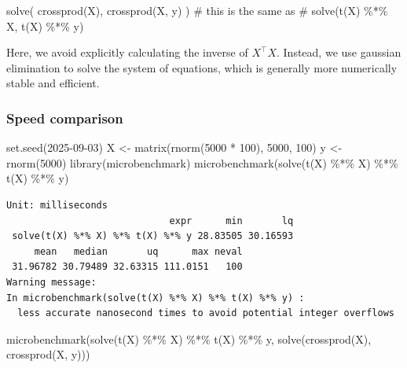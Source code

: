 \documentclass[
  letterpaper,
  DIV=11,
  numbers=noendperiod]{scrreprt}
\newenvironment{Shaded}{\begin{snugshade}}{\end{snugshade}}
\newcommand{\CommentTok}[1]{\textcolor[rgb]{0.37,0.37,0.37}{#1}}
\newcommand{\DecValTok}[1]{\textcolor[rgb]{0.68,0.00,0.00}{#1}}
\newcommand{\FunctionTok}[1]{\textcolor[rgb]{0.28,0.35,0.67}{#1}}
\newcommand{\NormalTok}[1]{\textcolor[rgb]{0.00,0.23,0.31}{#1}}
\newcommand{\OtherTok}[1]{\textcolor[rgb]{0.00,0.23,0.31}{#1}}
\newcommand{\SpecialCharTok}[1]{\textcolor[rgb]{0.37,0.37,0.37}{#1}}
\begin{document}
\begin{Shaded}
\begin{Highlighting}[]
\FunctionTok{solve}\NormalTok{( }\FunctionTok{crossprod}\NormalTok{(X), }\FunctionTok{crossprod}\NormalTok{(X, y) ) }
\CommentTok{\# this is the same as }
\CommentTok{\# solve(t(X) \%*\% X, t(X) \%*\% y)}
\end{Highlighting}
\end{Shaded}

Here, we avoid explicitly calculating the inverse of \(X^\top X\).
Instead, we use gaussian elimination to solve the system of equations,
which is generally more numerically stable and efficient.

\subsubsection{Speed comparison}\label{speed-comparison}

\begin{Shaded}
\begin{Highlighting}[]
\FunctionTok{set.seed}\NormalTok{(}\DecValTok{2025{-}09{-}03}\NormalTok{)}
\NormalTok{X }\OtherTok{\textless{}{-}} \FunctionTok{matrix}\NormalTok{(}\FunctionTok{rnorm}\NormalTok{(}\DecValTok{5000} \SpecialCharTok{*} \DecValTok{100}\NormalTok{), }\DecValTok{5000}\NormalTok{, }\DecValTok{100}\NormalTok{)}
\NormalTok{y }\OtherTok{\textless{}{-}} \FunctionTok{rnorm}\NormalTok{(}\DecValTok{5000}\NormalTok{)}
\FunctionTok{library}\NormalTok{(microbenchmark)}
\FunctionTok{microbenchmark}\NormalTok{(}\FunctionTok{solve}\NormalTok{(}\FunctionTok{t}\NormalTok{(X) }\SpecialCharTok{\%*\%}\NormalTok{ X) }\SpecialCharTok{\%*\%} \FunctionTok{t}\NormalTok{(X) }\SpecialCharTok{\%*\%}\NormalTok{ y)}
\end{Highlighting}
\end{Shaded}

\begin{verbatim}
Unit: milliseconds
                             expr      min       lq
 solve(t(X) %*% X) %*% t(X) %*% y 28.83505 30.16593
     mean   median       uq      max neval
 31.96782 30.79489 32.63315 111.0151   100
Warning message:
In microbenchmark(solve(t(X) %*% X) %*% t(X) %*% y) :
  less accurate nanosecond times to avoid potential integer overflows
\end{verbatim}

\begin{Shaded}
\begin{Highlighting}[]
\FunctionTok{microbenchmark}\NormalTok{(}\FunctionTok{solve}\NormalTok{(}\FunctionTok{t}\NormalTok{(X) }\SpecialCharTok{\%*\%}\NormalTok{ X) }\SpecialCharTok{\%*\%} \FunctionTok{t}\NormalTok{(X) }\SpecialCharTok{\%*\%}\NormalTok{ y,}
               \FunctionTok{solve}\NormalTok{(}\FunctionTok{crossprod}\NormalTok{(X), }\FunctionTok{crossprod}\NormalTok{(X, y)))}
\end{Highlighting}
\end{Shaded}
\end{document}
